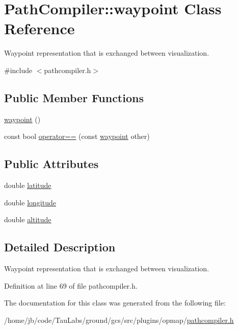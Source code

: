 \hypertarget{class_path_compiler_1_1waypoint}{\section{\-Path\-Compiler\-:\-:waypoint \-Class \-Reference}
\label{class_path_compiler_1_1waypoint}
}


\-Waypoint representation that is exchanged between visualization.  




{\ttfamily \#include $<$pathcompiler.\-h$>$}

\subsection*{\-Public \-Member \-Functions}
\begin{DoxyCompactItemize}
\item 
\hyperlink{group___o_p_map_plugin_ga9cfe5fa7f47eec99c5410789c9a6fea2}{waypoint} ()
\item 
const bool \hyperlink{group___o_p_map_plugin_ga2f0a3339103075c67e70706180c208e2}{operator==} (const \hyperlink{class_path_compiler_1_1waypoint}{waypoint} other)
\end{DoxyCompactItemize}
\subsection*{\-Public \-Attributes}
\begin{DoxyCompactItemize}
\item 
double \hyperlink{group___o_p_map_plugin_ga78f3936ec843f0060648b9503702acd6}{latitude}
\item 
double \hyperlink{group___o_p_map_plugin_ga698954b834d77d2eb539e287bc6bc9e0}{longitude}
\item 
double \hyperlink{group___o_p_map_plugin_ga538be1c7d40ec1ac89c5faad4012154e}{altitude}
\end{DoxyCompactItemize}


\subsection{\-Detailed \-Description}
\-Waypoint representation that is exchanged between visualization. 

\-Definition at line 69 of file pathcompiler.\-h.



\-The documentation for this class was generated from the following file\-:\begin{DoxyCompactItemize}
\item 
/home/jb/code/\-Tau\-Labs/ground/gcs/src/plugins/opmap/\hyperlink{pathcompiler_8h}{pathcompiler.\-h}\end{DoxyCompactItemize}
